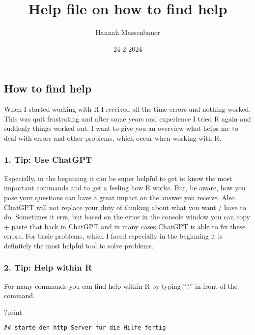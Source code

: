 \documentclass[
]{article}
\title{Help file on how to find help}
\author{Hannah Massenbauer}
\date{24 2 2024}
\newenvironment{Shaded}{\begin{snugshade}}{\end{snugshade}}
\newcommand{\NormalTok}[1]{#1}
\begin{document}
\maketitle

\hypertarget{how-to-find-help}{%
\subsection{How to find help}\label{how-to-find-help}}

When I started working with R I received all the time errors and nothing
worked. This was quit frustrating and after some years and experience I
tried R again and suddenly things worked out. I want to give you an
overview what helps me to deal with errors and other problems, which
occur when working with R.

\hypertarget{tip-use-chatgpt}{%
\subsubsection{1. Tip: Use ChatGPT}\label{tip-use-chatgpt}}

Especially, in the beginning it can be super helpful to get to know the
most important commands and to get a feeling how R works. But, be aware,
how you pose your questions can have a great impact on the answer you
receive. Also ChatGPT will not replace your duty of thinking about what
you want / have to do. Sometimes it errs, but based on the error in the
console window you can copy + paste that back in ChatGPT and in many
cases ChatGPT is able to fix these errors. For basic problems, which I
faced especially in the beginning it is definitely the most helpful tool
to solve problems.

\hypertarget{tip-help-within-r}{%
\subsubsection{2. Tip: Help within R}\label{tip-help-within-r}}

For many commands you can find help within R by typing ``?'' in front of
the command.

\begin{Shaded}
\begin{Highlighting}[]
\NormalTok{?print}
\end{Highlighting}
\end{Shaded}

\begin{verbatim}
## starte den http Server für die Hilfe fertig
\end{verbatim}
\end{document}
